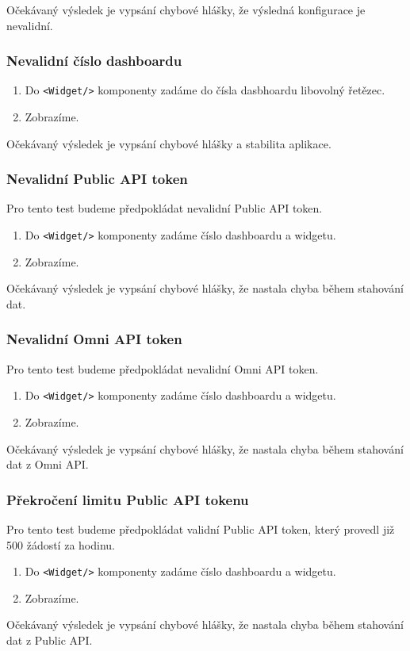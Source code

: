 \documentclass[czech, bc, kiv, he, iso690numb]{fasthesis}
\begin{document}
Očekávaný výsledek je vypsání chybové hlášky, že výsledná konfigurace je nevalidní.

\subsubsection{Nevalidní číslo dashboardu}
\begin{enumerate}
	\item Do \texttt{<Widget/>} komponenty zadáme do čísla dasbhoardu libovolný řetězec.
	\item Zobrazíme.
\end{enumerate}
Očekávaný výsledek je vypsání chybové hlášky a stabilita aplikace.

\subsubsection{Nevalidní Public API token}
Pro tento test budeme předpokládat nevalidní Public API token.
\begin{enumerate}
	\item Do \texttt{<Widget/>} komponenty zadáme číslo dashboardu a widgetu.
	\item Zobrazíme.
\end{enumerate}
Očekávaný výsledek je vypsání chybové hlášky, že nastala chyba během stahování dat.

\subsubsection{Nevalidní Omni API token}
Pro tento test budeme předpokládat nevalidní Omni API token.
\begin{enumerate}
	\item Do \texttt{<Widget/>} komponenty zadáme číslo dashboardu a widgetu.
	\item Zobrazíme.
\end{enumerate}
Očekávaný výsledek je vypsání chybové hlášky, že nastala chyba během stahování dat z Omni API.

\subsubsection{Překročení limitu Public API tokenu}
Pro tento test budeme předpokládat validní Public API token, který provedl již 500 žádostí za hodinu.
\begin{enumerate}
	\item Do \texttt{<Widget/>} komponenty zadáme číslo dashboardu a widgetu.
	\item Zobrazíme.
\end{enumerate}
Očekávaný výsledek je vypsání chybové hlášky, že nastala chyba během stahování dat z Public API.
\end{document}

